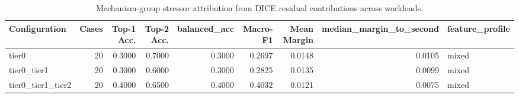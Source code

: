 \begin{table}[t]
\centering
\caption{Mechanism-group stressor attribution from DICE residual contributions across workloads.}
\label{tab:dice_stressor_diagnosis}
\footnotesize
\begin{tabular}{lrrrrrrrl}
\toprule
Configuration & Cases & Top-1 Acc. & Top-2 Acc. & balanced_acc & Macro-F1 & Mean Margin & median_margin_to_second & feature_profile \\
\midrule
tier0 & 20 & 0.3000 & 0.7000 & 0.3000 & 0.2697 & 0.0148 & 0.0105 & mixed \\
tier0_tier1 & 20 & 0.3000 & 0.6000 & 0.3000 & 0.2825 & 0.0135 & 0.0099 & mixed \\
tier0_tier1_tier2 & 20 & 0.4000 & 0.6500 & 0.4000 & 0.4032 & 0.0121 & 0.0075 & mixed \\
\bottomrule
\end{tabular}

\end{table}
